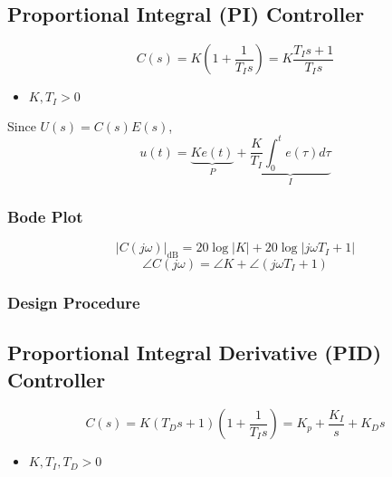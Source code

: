 \subsection{Proportional Integral (PI) Controller}
\begin{motivation}

\end{motivation}

\begin{definition}
    \begin{equation}
        C(s) = K \left(1 + \frac{1}{T_I s}\right) = K \frac{T_I s + 1}{T_I s}
    \end{equation}
    \begin{itemize}
        \item $K,T_I > 0$
    \end{itemize}
    \vspace{1em}

    Since $U(s) = C(s)E(s)$, 
    \begin{equation}
        u(t) = \underbrace{K e(t)}_{P} + \underbrace{\frac{K}{T_I} \int_0^t e(\tau) d\tau}_{I}
    \end{equation}
\end{definition}

\subsubsection{Bode Plot}
\begin{notes}
    \begin{equation*}
        |C(j\omega)|_{\text{dB}} = 20 \log |K| + 20 \log |j \omega T_I + 1|
    \end{equation*}
    \begin{equation*}
        \angle C(j\omega) = \angle K + \angle (j \omega T_I + 1)
    \end{equation*}
\end{notes}

\subsubsection{Design Procedure}

\subsection{Proportional Integral Derivative (PID) Controller}
\begin{definition}
    \begin{equation}
        C(s) = K(T_D s + 1)\left(1 + \frac{1}{T_I s}\right) = K_p + \frac{K_I}{s} + K_D s
    \end{equation}
    \begin{itemize}
        \item $K,T_I,T_D >0$ 
    \end{itemize}
\end{definition}

